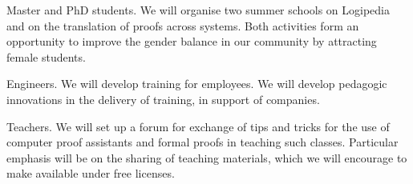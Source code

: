 \begin{workpackage}[id=dissemination,type=MGT,wphases=1-48,
  short={Dissemination},
  title={Dissemination, communication and exploitation},
  lead=Lie,LieRM=3,InrRM=6,BirRM=4,CleRM=2,ImtRM=2,StrRM=2,ZibRM=14,EduRM=12]
\begin{tasklist}
\begin{task}[id=training,
      title=Training Logipedia developers and users,
      shorttitle=Train.,
      lead=Bir,BirRM=2,wphases=1-48!.05]
    \begin{compactitem}
    \item Master and PhD students.
      We will organise two summer schools on Logipedia
      and on the translation of proofs across systems.
      Both activities form an
      opportunity to improve the gender balance in our community by
      attracting female students.
    \item Engineers.
      We will develop training for employees.
      We will develop pedagogic innovations in the delivery of training,
      in support of companies.
    \item Teachers.
      We will set up a forum for exchange of tips and tricks for the use
      of computer proof assistants and formal proofs in teaching such classes.
      Particular emphasis will be on the sharing of teaching materials, which
      we will encourage to make available under free licenses.
    \end{compactitem}

  \end{task}


\end{tasklist}
\end{workpackage}

